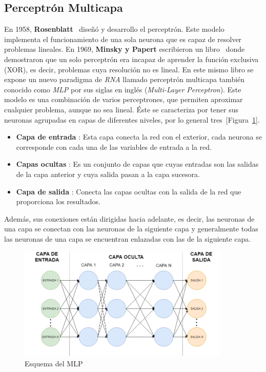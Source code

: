 

\subsection{Perceptrón Multicapa}
\label{sec:mlp}

En 1958, \textbf{Rosenblatt}~\cite{rosenblatt1960perceptron} diseñó y desarrollo el perceptrón. Este modelo implementa el funcionamiento de una sola neurona que es capaz de resolver problemas lineales. En 1969, \textbf{Minsky y Papert} escribieron un libro~\cite{minsky2017perceptrons} donde demostraron que un solo perceptrón era incapaz de aprender la función exclusiva (XOR), es decir, problemas cuya resolución no es lineal. En este mismo libro se expone un nuevo paradigma de \textit{RNA} llamado perceptrón multicapa  también conocido como \textit{MLP} por sus siglas en inglés (\textit{Multi-Layer Perceptron}). Este modelo es una combinación de varios perceptrones, que permiten aproximar cualquier problema, aunque no sea lineal. Éste se caracteriza por tener sus neuronas agrupadas en capas de diferentes niveles, por lo general tres~[Figura~\ref{fig:schematic_MLP}]. 

\begin{itemize}
    \item \textbf{Capa de entrada }: Esta capa conecta la red con el exterior, cada neurona se corresponde con cada una de las variables de entrada a la red.
    
    \item \textbf{Capas ocultas }: Es un conjunto de capas que cuyas entradas son las salidas de la capa anterior y cuya salida pasan a la capa sucesora.
    
    \item \textbf{Capa de salida }: Conecta las capas ocultas con la salida de la red que proporciona los resultados.
\end{itemize}

Además, sus conexiones están dirigidas hacia adelante, es decir, las neuronas de una capa se conectan con las neuronas de la siguiente capa y generalmente todas las neuronas de una capa se encuentran enlazadas con las de la siguiente capa.


\begin{figure}[H]
    \centering
    \includegraphics[width=0.9\textwidth, keepaspectratio]{imaxes/schematic_mlp.png}
    \caption{Esquema del MLP}
    \label{fig:schematic_MLP}
\end{figure}

